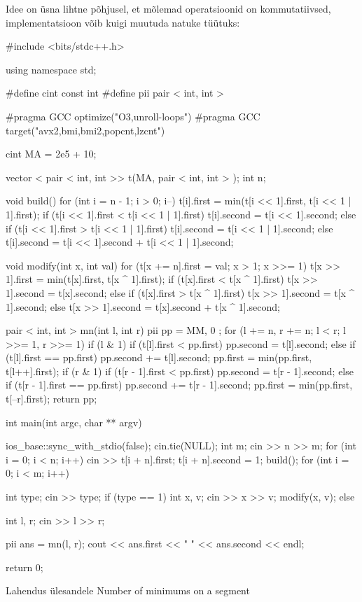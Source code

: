 \documentclass{trkut}
\begin{document}
Idee on üsna lihtne põhjusel, et mõlemad operatsioonid on kommutatiivsed, implementatsioon võib kuigi muutuda natuke tüütuks:
\begin{cclol}
#include <bits/stdc++.h>

using namespace std;

#define cint
const int
#define pii pair < int, int >

#pragma GCC optimize("O3,unroll-loops")
#pragma GCC target("avx2,bmi,bmi2,popcnt,lzcnt")

cint MA = 2e5 + 10;

vector < pair < int, int >> t(MA, pair < int, int > {});
int n;

void build() {
  for (int i = n - 1; i > 0; i--) {
    t[i].first = min(t[i << 1].first, t[i << 1 | 1].first);
    if (t[i << 1].first < t[i << 1 | 1].first) {
      t[i].second = t[i << 1].second;
    } else if (t[i << 1].first > t[i << 1 | 1].first) {
      t[i].second = t[i << 1 | 1].second;
    } else {
      t[i].second = t[i << 1].second + t[i << 1 | 1].second;
    }
  }
}

void modify(int x, int val) {
  for (t[x += n].first = val; x > 1; x >>= 1) {
    t[x >> 1].first = min(t[x].first, t[x ^ 1].first);
    if (t[x].first < t[x ^ 1].first) {
      t[x >> 1].second = t[x].second;
    } else if (t[x].first > t[x ^ 1].first) {
      t[x >> 1].second = t[x ^ 1].second;
    } else {
      t[x >> 1].second = t[x].second + t[x ^ 1].second;
    }
  }
}

pair < int, int > mn(int l, int r) {
  pii pp = {
    MM,
    0
  };
  for (l += n, r += n; l < r; l >>= 1, r >>= 1) {
    if (l & 1) {
    if (t[l].first < pp.first) pp.second = t[l].second;
    else if (t[l].first == pp.first) pp.second += t[l].second;
    pp.first = min(pp.first, t[l++].first);
    }
    if (r & 1) {
    if (t[r - 1].first < pp.first) pp.second = t[r - 1].second;
    else if (t[r - 1].first == pp.first) pp.second += t[r - 1].second;
    pp.first = min(pp.first, t[--r].first);
    }
  }
  return pp;
}

int main(int argc, char ** argv) {
  ios_base::sync_with_stdio(false);
  cin.tie(NULL);
  int m;
  cin >> n >> m;
  for (int i = 0; i < n; i++) {
    cin >> t[i + n].first;
    t[i + n].second = 1;
  }
  build();
  for (int i = 0; i < m; i++) {
    int type;
    cin >> type;
    if (type == 1) {
      int x, v;
      cin >> x >> v;
      modify(x, v);
    } else {
      int l, r;
      cin >> l >> r;

      pii ans = mn(l, r);
      cout << ans.first << " " << ans.second << endl;
    }
  }

  return 0;
}
    \end{cclol}
    \begin{kk}[H]
    \caption{Lahendus ülesandele Number of minimums on a segment}%
    \end{kk}
\end{document}
